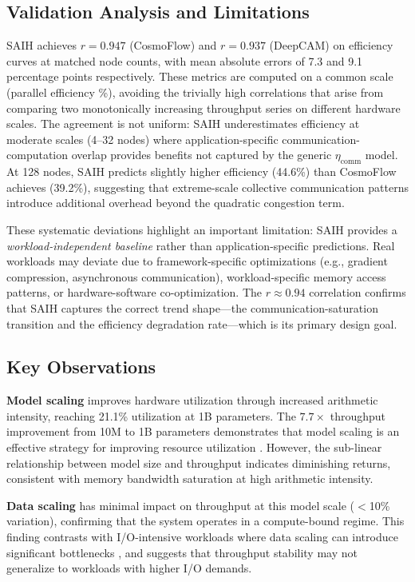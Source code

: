 \documentclass{llncs}
\begin{document}
\subsection{Validation Analysis and Limitations}

SAIH achieves $r=0.947$ (CosmoFlow) and $r=0.937$ (DeepCAM) on efficiency curves at matched node counts, with mean absolute errors of 7.3 and 9.1 percentage points respectively. These metrics are computed on a common scale (parallel efficiency \%), avoiding the trivially high correlations that arise from comparing two monotonically increasing throughput series on different hardware scales. The agreement is not uniform: SAIH underestimates efficiency at moderate scales (4--32 nodes) where application-specific communication-computation overlap provides benefits not captured by the generic $\eta_{\text{comm}}$ model. At 128 nodes, SAIH predicts slightly higher efficiency (44.6\%) than CosmoFlow achieves (39.2\%), suggesting that extreme-scale collective communication patterns introduce additional overhead beyond the quadratic congestion term.

These systematic deviations highlight an important limitation: SAIH provides a \textit{workload-independent baseline} rather than application-specific predictions. Real workloads may deviate due to framework-specific optimizations (e.g., gradient compression, asynchronous communication), workload-specific memory access patterns, or hardware-software co-optimization. The $r \approx 0.94$ correlation confirms that SAIH captures the correct trend shape---the communication-saturation transition and the efficiency degradation rate---which is its primary design goal.

\subsection{Key Observations}

\textbf{Model scaling} improves hardware utilization through increased arithmetic intensity, reaching 21.1\% utilization at 1B parameters. The $7.7\times$ throughput improvement from 10M to 1B parameters demonstrates that model scaling is an effective strategy for improving resource utilization \cite{Jia2018}. However, the sub-linear relationship between model size and throughput indicates diminishing returns, consistent with memory bandwidth saturation at high arithmetic intensity.

\textbf{Data scaling} has minimal impact on throughput at this model scale ($<$10\% variation), confirming that the system operates in a compute-bound regime. This finding contrasts with I/O-intensive workloads where data scaling can introduce significant bottlenecks \cite{Byna2020}, and suggests that throughput stability may not generalize to workloads with higher I/O demands.
\end{document}
